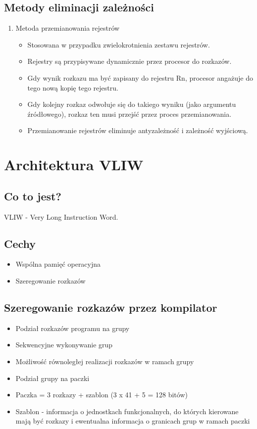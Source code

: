 \documentclass[a4paper,twoside]{article}
\begin{document}
		\subsection*{Metody eliminacji zależności}
			\begin{enumerate}
				\item Metoda przemianowania rejestrów
				\begin{itemize}
					\item Stosowana w przypadku zwielokrotnienia zestawu rejestrów.
					\item Rejestry są przypisywane dynamicznie przez procesor do rozkazów.
					\item Gdy wynik rozkazu ma być zapisany do rejestru Rn, procesor angażuje do tego nową kopię tego rejestru.
					\item Gdy kolejny rozkaz odwołuje się do takiego wyniku (jako argumentu źródłowego), rozkaz ten musi przejść przez proces przemianowania.
					\item Przemianowanie rejestrów eliminuje antyzależność i zależność wyjściową.
				\end{itemize}
			\end{enumerate}
			
	\section*{Architektura VLIW}
		\subsection*{Co to jest?}
		VLIW - Very Long Instruction Word.
		\subsection*{Cechy}
		\begin{itemize}
			\item Wspólna pamięć operacyjna
			\item Szeregowanie rozkazów
		\end{itemize}
		\subsection*{Szeregowanie rozkazów przez kompilator}
		\begin{itemize}
			\item Podział rozkazów programu na grupy
			\item Sekwencyjne wykonywanie grup
			\item Możliwość równoległej realizacji rozkazów w ramach grupy
			\item Podział grupy na paczki
			\item Paczka = 3 rozkazy + szablon (3 x 41 + 5 = 128 bitów)
			\item Szablon - informacja o jednostkach funkcjonalnych, do których kierowane mają być rozkazy i ewentualna informacja o granicach grup w ramach paczki
		\end{itemize}
\end{document}
